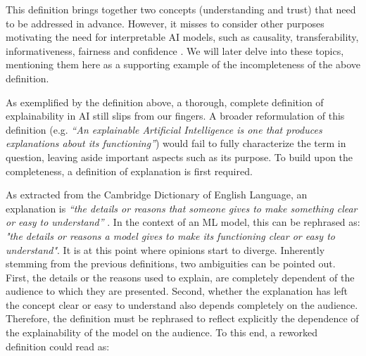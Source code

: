 \documentclass[final]{elsarticle}
\begin{document}
This definition brings together two concepts (understanding and trust) that need to be addressed in advance. However, it misses to consider other purposes motivating the need for interpretable AI models, such as causality, transferability, informativeness, fairness and confidence \cite{Lipton18,WhatDoesExplainableAImean,TowardsInterpretability,MakingInterpretable}. We will later delve into these topics, mentioning them here as a supporting example of the incompleteness of the above definition.

As exemplified by the definition above, a thorough, complete definition of explainability in AI still slips from our fingers. A broader reformulation of this definition (e.g. \textit{``An explainable Artificial Intelligence is one that produces explanations about its functioning''}) would fail to fully characterize the term in question, leaving aside important aspects such as its purpose. To build upon the completeness, a definition of explanation is first required. 

As extracted from the Cambridge Dictionary of English Language, an explanation is \textit{``the details or reasons that someone gives to make something clear or easy to understand''} \cite{walter2008cambridge}. In the context of an ML model, this can be rephrased as: \textit{"the details or reasons a model gives to make its functioning clear or easy to understand"}. It is at this point where opinions start to diverge. Inherently stemming from the previous definitions, two ambiguities can be pointed out. First, the details or the reasons used to explain, are completely dependent of the audience to which they are presented. Second, whether the explanation has left the concept clear or easy to understand also depends completely on the audience. Therefore, the definition must be rephrased to reflect explicitly the dependence of the explainability of the model on the audience. To this end, a reworked definition could read as: 
\begin{center}
	\noindent{}
\end{center}
\end{document}
